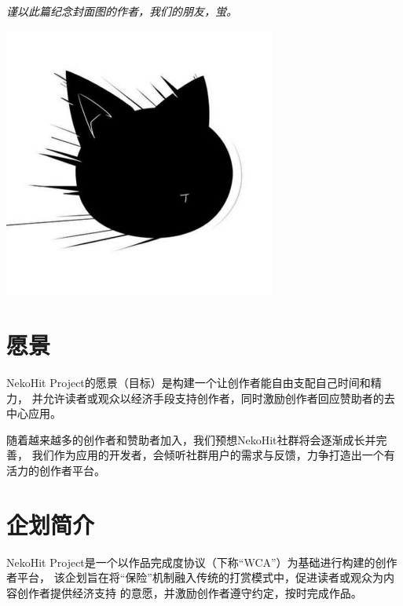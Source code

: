 \documentclass[11pt,UTF8,a4paper]{ctexart}
\begin{document}

    \thispagestyle{empty}
    \vspace*{\fill}
    \begin{center}
        \textit{谨以此篇纪念封面图的作者，我们的朋友，蛍。}
    \end{center}
    \vspace*{\fill}
    \clearpage

    \tableofcontents
    \vspace*{\fill}
    \begin{center}
        \includegraphics[width=0.67\textwidth]{assets/img197}
    \end{center}
    \clearpage



    \section{愿景}\label{sec:goal}

    NekoHit Project的愿景（目标）是构建一个让创作者能自由支配自己时间和精力，
    并允许读者或观众以经济手段支持创作者，同时激励创作者回应赞助者的去中心应用。

    随着越来越多的创作者和赞助者加入，我们预想NekoHit社群将会逐渐成长并完善，
    我们作为应用的开发者，会倾听社群用户的需求与反馈，力争打造出一个有活力的创作者平台。


    \section{企划简介}\label{sec:intro}

    NekoHit Project是一个以作品完成度协议（下称“WCA”）为基础进行构建的创作者平台，
    该企划旨在将“保险”机制融入传统的打赏模式中，促进读者或观众为内容创作者提供经济支持
    的意愿，并激励创作者遵守约定，按时完成作品。
\end{document}
